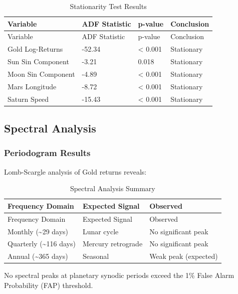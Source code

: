 \documentclass[
  11pt,
  a4paper,
  oneside,
  openany]{article}
\begin{document}
\begin{longtable}[]{@{}llll@{}}
\caption{Stationarity Test
Results}\label{tbl-stationarity}\tabularnewline
\toprule\noalign{}
Variable & ADF Statistic & p-value & Conclusion \\
\midrule\noalign{}
\endfirsthead
\toprule\noalign{}
Variable & ADF Statistic & p-value & Conclusion \\
\midrule\noalign{}
\endhead
\bottomrule\noalign{}
\endlastfoot
Gold Log-Returns & -52.34 & \textless{} 0.001 & Stationary \\
Sun Sin Component & -3.21 & 0.018 & Stationary \\
Moon Sin Component & -4.89 & \textless{} 0.001 & Stationary \\
Mars Longitude & -8.72 & \textless{} 0.001 & Stationary \\
Saturn Speed & -15.43 & \textless{} 0.001 & Stationary \\
\end{longtable}

\subsection{Spectral Analysis}\label{spectral-analysis-1}

\subsubsection{Periodogram Results}\label{periodogram-results}

Lomb-Scargle analysis of Gold returns reveals:

\begin{longtable}[]{@{}lll@{}}
\caption{Spectral Analysis Summary}\label{tbl-spectral}\tabularnewline
\toprule\noalign{}
Frequency Domain & Expected Signal & Observed \\
\midrule\noalign{}
\endfirsthead
\toprule\noalign{}
Frequency Domain & Expected Signal & Observed \\
\midrule\noalign{}
\endhead
\bottomrule\noalign{}
\endlastfoot
Monthly (\textasciitilde29 days) & Lunar cycle & No significant peak \\
Quarterly (\textasciitilde116 days) & Mercury retrograde & No
significant peak \\
Annual (\textasciitilde365 days) & Seasonal & Weak peak (expected) \\
\end{longtable}

No spectral peaks at planetary synodic periods exceed the 1\% False
Alarm Probability (FAP) threshold.
\end{document}
